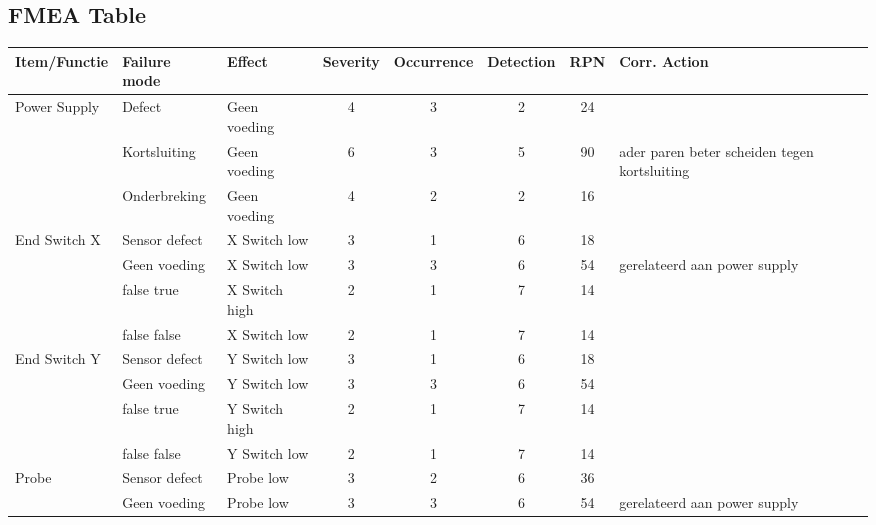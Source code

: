 \documentclass{article}
\begin{document}
\newpage
\begin{landscape}
    \subsection{FMEA Table}  \label{sec:FMEA Table} 
    \begin{longtable}{|l|l|l|c|c|c|c|l|}
        \hline
        \textbf{Item/Functie} & \textbf{Failure mode} & \textbf{Effect} & \textbf{Severity} & \textbf{Occurrence} & \textbf{Detection} & \textbf{RPN} & \textbf{Corr. Action} \\ \hline
        \multirow{3}{*}{Power Supply}       & Defect            & Geen voeding  & 4 & 3 & 2 & 24 & \\
                                            & Kortsluiting      & Geen voeding  & 6 & 3 & 5 & 90 & ader paren beter scheiden tegen kortsluiting\\
                                            & Onderbreking      & Geen voeding  & 4 & 2 & 2 & 16 & \\
                                            \hline
        \multirow{4}{*}{End Switch X}       & Sensor defect     & X Switch low  & 3 & 1 & 6 & 18 & \\
                                            & Geen voeding      & X Switch low  & 3 & 3 & 6 & 54 &  gerelateerd aan power supply\\
                                            & false true        & X Switch high & 2 & 1 & 7 & 14 & \\
                                            & false false       & X Switch low  & 2 & 1 & 7 & 14 & \\ 
                                            \hline
        \multirow{4}{*}{End Switch Y}       & Sensor defect     & Y Switch low  & 3 & 1 & 6 & 18 & \\
                                            & Geen voeding      & Y Switch low  & 3 & 3 & 6 & 54 & \\
                                            & false true        & Y Switch high & 2 & 1 & 7 & 14 & \\
                                            & false false       & Y Switch low  & 2 & 1 & 7 & 14 & \\ 
                                            \hline
        \multirow{4}{*}{Probe}              & Sensor defect     & Probe low  & 3 & 2 & 6 & 36 & \\
                                            & Geen voeding      & Probe low  & 3 & 3 & 6 & 54 & gerelateerd aan power supply\\

\end{longtable}
\end{landscape}
\end{document}
